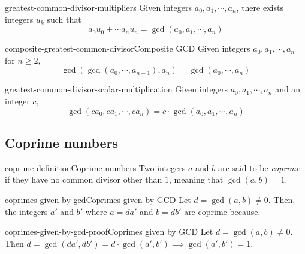 \documentclass[preview]{standalone}
\begin{document}
\begin{snippetproposition}{greatest-common-divisor-multipliers}{}
Given integers \(a_0, a_1, \cdots, a_n\), there exists integers \(u_k\) such that
\[
    a_0u_0 + \cdots a_n u_n = \gcd(a_0, a_1, \cdots, a_n)
\]
\end{snippetproposition}

\begin{snippetproposition}{composite-greatest-common-divisor}{Composite GCD}
Given integers \(a_0, a_1, \cdots, a_n\)
for \(n \geq 2\), \[\gcd(\gcd(a_0, \cdots, a_{n-1}), a_n) = \gcd(a_0, \cdots, a_n)\]
\end{snippetproposition}

\begin{snippetproposition}{greatest-common-divisor-scalar-multiplication}{}
    Given integers \(a_0, a_1, \cdots, a_n\) and  an integer \(c\),
    \[\gcd(ca_0, ca_1, \cdots, ca_n) = c \cdot \gcd(a_0, a_1, \cdots, a_n)\]
\end{snippetproposition}


\subsection{Coprime numbers}

\begin{snippetdefinition}{coprime-definition}{Coprime numbers}
    Two integers \(a\) and \(b\) are said to be \textit{coprime}
    if they have no common divisor other than \(1\), meaning that \(\gcd(a,b)=1\).
\end{snippetdefinition}

\begin{snippetproposition}{coprimes-given-by-gcd}{Coprimes given by GCD}
    Let \(d = \gcd(a, b) \neq 0\). Then, the integers \(a'\) and \(b'\) where \(a = da'\) and \(b = db'\)
    are coprime because.
\end{snippetproposition}

\begin{snippetproof}{coprimes-given-by-gcd-proof}{Coprimes given by GCD}
    Let \(d = \gcd(a, b) \neq 0\). Then \(d = \gcd(da', db') = d\cdot \gcd(a', b') \implies \gcd(a', b') = 1\).
\end{snippetproof}

\end{document}

